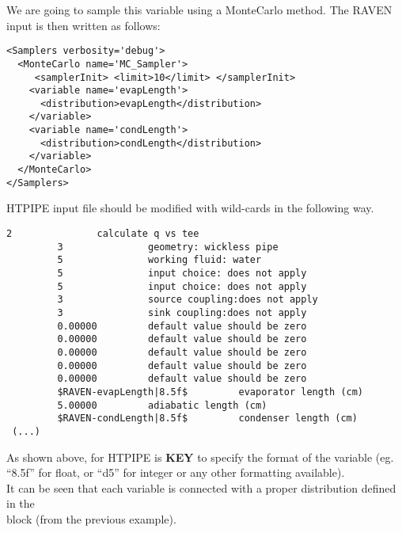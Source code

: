 \noindent We are going to sample this variable using a MonteCarlo method.
The RAVEN input is then written as follows:

\begin{lstlisting}[style=XML,morekeywords={name,type,construction,lowerBound,steps,limit,initialSeed}]
<Samplers verbosity='debug'>
  <MonteCarlo name='MC_Sampler'>
     <samplerInit> <limit>10</limit> </samplerInit>
    <variable name='evapLength'>
      <distribution>evapLength</distribution>
    </variable>
    <variable name='condLength'>
      <distribution>condLength</distribution>
    </variable>
  </MonteCarlo>
</Samplers>
\end{lstlisting}

HTPIPE input file should be modified with wild-cards in the following way.
\begin{lstlisting}[basicstyle=\tiny]
         2               calculate q vs tee
         3               geometry: wickless pipe    
         5               working fluid: water     
         5               input choice: does not apply      
         5               input choice: does not apply      
         3               source coupling:does not apply      
         3               sink coupling:does not apply      
         0.00000         default value should be zero                                     
         0.00000         default value should be zero                                     
         0.00000         default value should be zero                                     
         0.00000         default value should be zero                                     
         0.00000         default value should be zero                                     
         $RAVEN-evapLength|8.5f$         evaporator length (cm)
         5.00000         adiabatic length (cm)
         $RAVEN-condLength|8.5f$         condenser length (cm)                                            
 (...) 
\end{lstlisting}

As shown above, for HTPIPE is \textbf{KEY} to specify the format of the variable (eg. ``8.5f'' for float, or ``d5'' for integer or any other formatting available).\\

\noindent It can be seen that each variable is connected with a proper distribution
defined in the \\ block (from the previous example).

